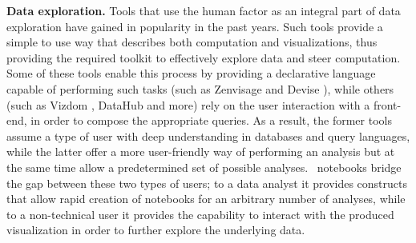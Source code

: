 

{\bf Data exploration.}  Tools that use the human factor as an integral part of data exploration have gained in popularity in the past years. Such tools provide a simple to use way that describes both computation and visualizations, thus providing the required toolkit to effectively explore data and steer computation. Some of these tools enable this process by providing a declarative language capable of performing such tasks (such as Zenvisage \cite{DBLP:journals/corr/SiddiquiKLKP16} and Devise \cite{livny1997devise}), while others (such as Vizdom \cite{crotty2015vizdom}, DataHub \cite{Krishnan:2016:AID:2994509.2994514} and more\cite{derthick1997interactive,  bhardwaj2015collaborative, zoumpatianos2015rinse, DBLP:conf/icde/LiarouI14, Kamat:2016:TSI:2939502.2939514}) rely on the user interaction with a front-end, in order to compose the appropriate queries. As a result, the former tools assume a type of user with deep understanding in databases and query languages, while the latter offer a more user-friendly way of performing an analysis but at the same time allow a predetermined set of possible analyses. \projname\ notebooks bridge the gap between these two types of users; to a data analyst it provides constructs that allow rapid creation of notebooks for an arbitrary number of analyses, while to a non-technical user it provides the capability to interact with the produced visualization in order to further explore the underlying data.
